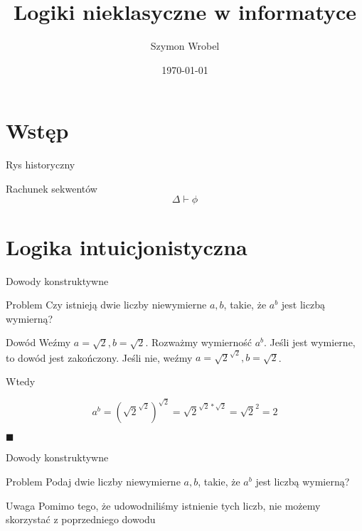 \documentclass{beamer}
\title[Logiki nieklasyczne]{Logiki nieklasyczne w informatyce}
\author{Szymon Wrobel}
\date{\today}
\begin{document}
\begin{frame}
\titlepage
\end{frame}



\section{Wstęp}
\begin{frame}{Rys historyczny}
    \begin{block}{Rachunek sekwentów}
    $$ \Delta \vdash \phi $$
    \end{block}
\end{frame}

\section{Logika intuicjonistyczna}
\begin{frame}{Dowody konstruktywne}
    \begin{block}{Problem}
    Czy istnieją dwie liczby niewymierne $a, b$, takie, że $a^b$ jest liczbą wymierną?
    \end{block}
    
    \pause
    
    \begin{block}{Dowód}
    Weźmy $a=\sqrt{2}, b=\sqrt{2}$. Rozważmy wymierność $a^{b}$. Jeśli jest wymierne, to dowód jest zakończony. Jeśli nie, weźmy $a=\sqrt{2}^{\sqrt{2}}, b=\sqrt{2}$.
    
    Wtedy
    
    $$ a^b = {\left( \sqrt{2}^{\sqrt{2}} \right)}^{\sqrt{2}}
    = \sqrt{2}^{\sqrt{2} \ast \sqrt{2}} = \sqrt{2}^2 = 2
    $$
    
    $\blacksquare$
    
    \end{block}
\end{frame}

\begin{frame}{Dowody konstruktywne}
    \begin{block}{Problem}
    Podaj dwie liczby niewymierne $a, b$, takie, że $a^b$ jest liczbą wymierną?
    \end{block}
    
    \pause
    
    \begin{alertblock}{Uwaga}
    Pomimo tego, że udowodniliśmy istnienie tych liczb, nie możemy skorzystać z poprzedniego dowodu
    \end{alertblock}
\end{frame}
\end{document}
